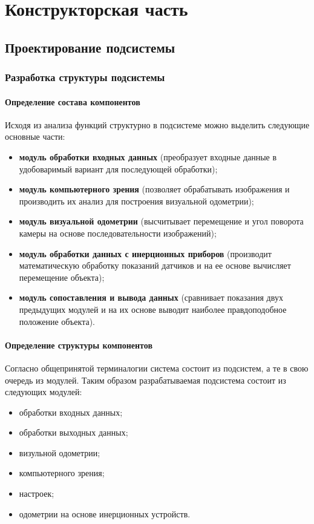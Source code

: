 \newpage

\section{Конструкторская часть}



\subsection{Проектирование подсистемы}
\subsubsection{Разработка структуры подсистемы}
\paragraph{Определение состава компонентов}

Исходя из анализа функций структурно в подсистеме можно выделить следующие основные части:
\begin{itemize}
\item \textbf{модуль обработки входных данных} (преобразует входные данные в удобоваримый вариант для последующей обработки);
\item \textbf{модуль компьютерного зрения }(позволяет обрабатывать изображения и производить их анализ для построения визуальной одометрии);
\item \textbf{модуль визуальной одометрии} (высчитывает перемещение и угол поворота камеры на основе последовательности изображений);
\item \textbf{модуль обработки данных с инерционных приборов} (производит математическую обработку показаний датчиков и на ее основе вычисляет перемещение объекта);
\item \textbf{модуль сопоставления  и вывода данных} (сравнивает показания двух предыдущих модулей и на их основе выводит наиболее правдоподобное положение объекта).
\end{itemize}

\paragraph{Определение структуры компонентов}
Согласно общепринятой терминалогии система состоит из подсистем, а те в свою очередь из модулей. Таким образом разрабатываемая подсистема состоит из следующих модулей:

\begin{itemize}
\item обработки входных данных;
\item обработки выходных данных;
\item визульной одометрии;
\item компьютерного зрения;
\item настроек;
\item одометрии на основе инерционных устройств.
\end{itemize}

